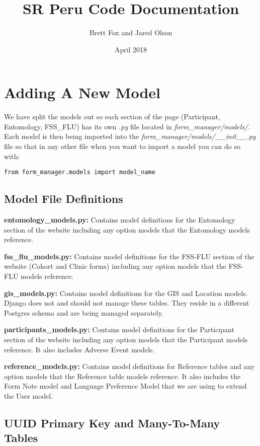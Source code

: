 \documentclass{article}
\title{ SR Peru Code Documentation}
\author{ Brett Fox and Jared Olson }
\date{ April 2018 }
\begin{document}
\maketitle

\newpage
\tableofcontents
\newpage

\section{Adding A New Model}
We have split the models out so each section of the page (Participant, Entomology, FSS\_FLU) has its own \textit{.py} file located in \textit{form\_manager/models/}.  Each model is then being imported into the \textit{form\_manager/models/\_\_init\_\_.py} file so that in any other file when you want to import a model you can do so with:
\begin{verbatim}
from form_manager.models import model_name
\end{verbatim}
\subsection{Model File Definitions}
\textbf{entomology\_models.py:} Contains model definitions for the Entomology section of the website including any option models that the Entomology models reference.

\textbf{fss\_flu\_models.py:} Contains model definitions for the FSS-FLU section of the website (Cohort and Clinic forms) including any option models that the FSS-FLU models reference.

\textbf{gis\_models.py:} Contains model definitions for the GIS and Location models.  Django does not and should not manage these tables.  They reside in a different Postgres schema and are being managed separately.

\textbf{participants\_models.py:} Contains model definitions for the Participant section of the website including any option models that the Participant models reference. It also includes Adverse Event models.

\textbf{reference\_models.py:} Contains model definitions for Reference tables and any option models that the Reference table models reference.  It also includes the Form Note model and Language Preference Model that we are using to extend the User model.

\subsection{UUID Primary Key and Many-To-Many Tables}
\end{document}
